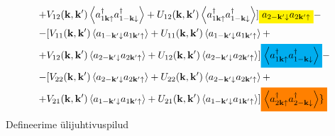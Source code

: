 \documentclass[class=article, crop=false]{standalone}
\newcommand{\mathcolorbox}[2]{\colorbox{#1}{$\displaystyle #2$}}
\begin{document}
\begin{equation}
\begin{split}
		+ & V_{ 1 2} ( \mathbf{k}, \mathbf{k}') \left\langle a^{ \dagger}_{ 1 \mathbf{k} \uparrow} a^{ \dagger}_{ 1 -\mathbf{k} \downarrow} \right\rangle + U_{ 1 2} ( \mathbf{k}, \mathbf{k}') \left\langle a^{ \dagger}_{ 1 \mathbf{k} \uparrow} a^{ \dagger}_{ 1 -\mathbf{k} \downarrow} \right\rangle ] \mathcolorbox{yellow}{a_{ 2 -\mathbf{k}' \downarrow} a_{ 2 \mathbf{k}' \uparrow}} - \\
		- & [ V_{ 1 1} ( \mathbf{k}, \mathbf{k}') \left\langle a_{ 1 -\mathbf{k}' \downarrow} a_{ 1 \mathbf{k}' \uparrow} \right\rangle + U_{ 1 1} ( \mathbf{k}, \mathbf{k}') \left\langle a_{ 1 -\mathbf{k}' \downarrow} a_{ 1 \mathbf{k}' \uparrow} \right\rangle + \\
		+ & V_{ 1 2} ( \mathbf{k}, \mathbf{k}') \left\langle a_{ 2 -\mathbf{k}' \downarrow} a_{ 2 \mathbf{k}' \uparrow} \right\rangle + U_{ 1 2} ( \mathbf{k}, \mathbf{k}') \left\langle a_{ 2 -\mathbf{k}' \downarrow} a_{ 2 \mathbf{k}' \uparrow} \right\rangle ] \mathcolorbox{cyan}{\left\langle a^{ \dagger}_{ 1 \mathbf{k} \uparrow} a^{ \dagger}_{ 1 -\mathbf{k} \downarrow} \right\rangle} - \\
		- & [ V_{ 2 2} ( \mathbf{k}, \mathbf{k}') \left\langle a_{ 2 -\mathbf{k}' \downarrow} a_{ 2 \mathbf{k}' \uparrow} \right\rangle + U_{ 2 2} ( \mathbf{k}, \mathbf{k}') \left\langle a_{ 2 -\mathbf{k}' \downarrow} a_{ 2 \mathbf{k}' \uparrow} \right\rangle + \\
		+ & V_{ 2 1} ( \mathbf{k}, \mathbf{k}') \left\langle a_{ 1 -\mathbf{k}' \downarrow} a_{ 1 \mathbf{k}' \uparrow} \right\rangle + U_{ 2 1} ( \mathbf{k}, \mathbf{k}') \left\langle a_{ 1 -\mathbf{k}' \downarrow} a_{ 1 \mathbf{k}' \uparrow} \right\rangle ] \mathcolorbox{orange}{ \left\langle a^{ \dagger}_{ 2 \mathbf{k} \uparrow} a^{ \dagger}_{ 2 -\mathbf{k} \downarrow} \right\rangle \rbrace}
	\end{split}
\end{equation}
Defineerime ülijuhtivuspilud
\end{document}
